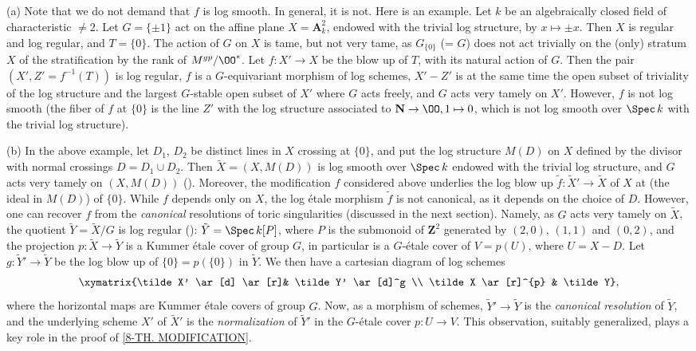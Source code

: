 \documentclass[10pt]{../fichiers-configuration-latex/smfart}
\begin{document}
\subsection{}\label{8-remarks main th.} (a) Note that we do
not demand that $f$ is log smooth. In general, it is not. Here
is an example. Let $k$ be an algebraically closed field of
characteristic $\ne 2$. Let $G = \{\pm 1\}$ act on the affine plane
$X = \mathbf{A}^2_k$, endowed with the trivial log structure, by
$x \mapsto \pm x$. Then $X$ is regular and log regular, and $T=
\{0\}$. The action of $G$ on $X$ is tame, but not very tame, as
$G_{\{0\}}$ (= $G$) does not act trivially on the (only) stratum $X$
of the stratification by the rank of $M^{gp}/\OO^*$. Let
$f\colon X' \to X$ be the blow up of $T$, with its natural action
of $G$. Then the pair $(X',Z' = f^{-1}(T))$ is log regular, $f$
is a $G$-equivariant morphism of log schemes, $X'-Z'$ is at the
same time the open subset of triviality of the log structure and
the largest $G$-stable open subset of $X'$ where $G$ acts freely,
and $G$ acts very tamely on $X'$. However, $f$ is not log smooth
(the fiber of $f$ at $\{0\}$ is the line $Z'$ with the log structure
associated to $\mathbf{N} \to \OO, 1 \mapsto 0$, which is
not log smooth over $\Spec\ \!  k$ with the trivial log structure).

(b) In the above example, let $D_1$, $D_2$ be distinct lines
in $X$ crossing at $\{0\}$, and put the log structure $M(D)$ on
$X$ defined by the divisor with normal crossings $D = D_1 \cup
D_2$. Then $\tilde X = (X,M(D))$ is log smooth over $\Spec\ \! k$
endowed with the trivial log structure, and $G$ acts very tamely
on $(X,M(D))$ ().  Moreover, the modification $f$
considered above underlies the log blow up $\tilde f\colon \tilde X'
\to \tilde X$ of $X$ at (the ideal in $M(D)$) of $\{0\}$. While
$f$ depends only on $X$, the log \'etale morphism $\tilde f$
is not canonical, as it depends on the choice of $D$. However,
one can recover $f$ from the \textit{canonical} resolutions of
toric singularities (discussed in the next section). Namely,
as $G$ acts very tamely on $\tilde X$, the quotient $\tilde Y =
\tilde X/G$ is log regular (): $\tilde Y = \Spec\
\! k[P]$, where $P$ is the submonoid of $\mathbf{Z}^2$ generated
by $(2,0)$, $(1,1)$ and $(0,2)$, and the projection $p\colon
\tilde X \to \tilde Y$ is a Kummer \'etale cover of group $G$,
in particular is a $G$-\'etale cover of $V = p(U)$, where $U = X -
D$. Let $g\colon \tilde Y' \to \tilde Y$ be the log blow up of $\{0\}
= p(\{0\})$ in $\tilde Y$. We then have a cartesian diagram of log
schemes $$ \xymatrix{\tilde X' \ar[d] \ar[r]& \tilde Y' \ar[d]^g \\
\tilde X \ar[r]^{p} & \tilde Y}, $$ where the horizontal maps are
Kummer \'etale covers of group $G$. Now, as a morphism of schemes,
$\tilde Y' \to \tilde Y$ is the \textit{canonical resolution}
of $\tilde Y$, and the underlying scheme $X'$ of $\tilde X'$
is the \textit{normalization} of $\tilde Y'$ in the $G$-\'etale
cover $p\colon U \to V$. This observation, suitably generalized,
plays a key role in the proof of \ref{8-TH. MODIFICATION}.
\end{document}
